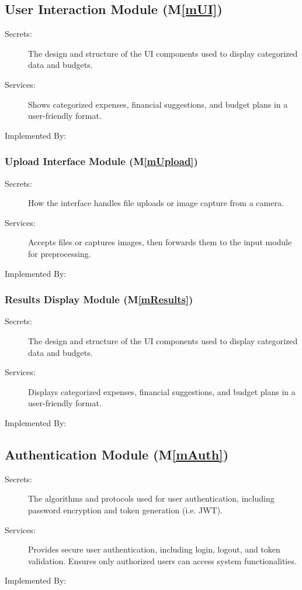 \documentclass[12pt, titlepage]{article}
\newcommand{\mref}[1]{M\ref{#1}}
\begin{document}
\subsection{User Interaction Module (\mref{mUI})}

\begin{description}
\item[Secrets:] The design and structure of the UI components used to display categorized data and budgets.
\item[Services:] Shows categorized expenses, financial suggestions, and budget plans in a user-friendly format.
\item[Implemented By:] \progname
\end{description}

\subsubsection{Upload Interface Module (\mref{mUpload})}

\begin{description}
\item[Secrets:] How the interface handles file uploads or image capture from a camera.
\item[Services:] Accepts files or captures images, then forwards them to the input module for preprocessing.
\item[Implemented By:] \progname
\end{description}

\subsubsection{Results Display Module (\mref{mResults})}

\begin{description}
\item[Secrets:] The design and structure of the UI components used to display categorized data and budgets.
\item[Services:] Displays categorized expenses, financial suggestions, and budget plans in a user-friendly format.
\item[Implemented By:] \progname
\end{description}

\subsection{Authentication Module (\mref{mAuth})}

\begin{description}
\item[Secrets:] The algorithms and protocols used for user authentication, including password encryption and token generation (i.e. JWT).
\item[Services:] Provides secure user authentication, including login, logout, and token validation. Ensures only authorized users can access system functionalities.
\item[Implemented By:] \progname
\end{description}
\end{document}
